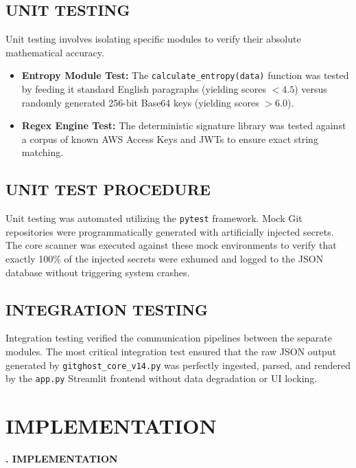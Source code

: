 \documentclass[12pt, a4paper, oneside]{report}
\begin{document}
\section{UNIT TESTING}
Unit testing involves isolating specific modules to verify their absolute mathematical accuracy.
\begin{itemize}
    \item \textbf{Entropy Module Test:} The \texttt{calculate\_entropy(data)} function was tested by feeding it standard English paragraphs (yielding scores $< 4.5$) versus randomly generated 256-bit Base64 keys (yielding scores $> 6.0$).
    \item \textbf{Regex Engine Test:} The deterministic signature library was tested against a corpus of known AWS Access Keys and JWTs to ensure exact string matching.
\end{itemize}

\section{UNIT TEST PROCEDURE}
Unit testing was automated utilizing the \texttt{pytest} framework. Mock Git repositories were programmatically generated with artificially injected secrets. The core scanner was executed against these mock environments to verify that exactly 100\% of the injected secrets were exhumed and logged to the JSON database without triggering system crashes.

\section{INTEGRATION TESTING}
Integration testing verified the communication pipelines between the separate modules. The most critical integration test ensured that the raw JSON output generated by \texttt{gitghost\_core\_v14.py} was perfectly ingested, parsed, and rendered by the \texttt{app.py} Streamlit frontend without data degradation or UI locking.

\chapter{IMPLEMENTATION}
\begin{center}
    {\Large \textbf{\thechapter. IMPLEMENTATION} \par}
\end{center}
\vspace{1cm}
\end{document}

